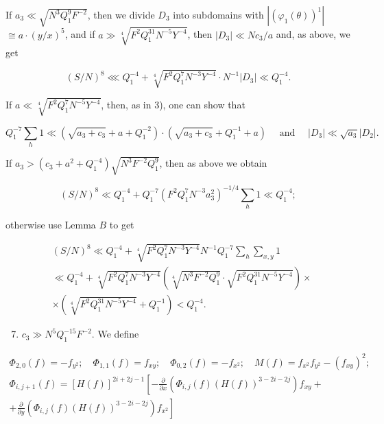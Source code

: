 \documentclass[10pt]{article}
\begin{document}
If $a_{3} \ll \sqrt{N^{3} Q_{1}^{9} F^{-2}}$, then we divide $D_{3}$ into subdomains with $\left|\left(\varphi_{1}(\theta)\right)^{1}\right|$ $\cong a \cdot(y / x)^{5}$, and if $a \gg \sqrt[4]{F^{2} Q_{1}^{31} N^{-5} Y^{-4}}$, then $\left|D_{3}\right| \ll N c_{3} / a$ and, as above, we get

$$
(S / N)^{8} \lll Q_{1}^{-4}+\sqrt[4]{F^{2} Q_{1}^{7} N^{-3} Y^{-4}} \cdot N^{-1}\left|D_{3}\right| \ll Q_{1}^{-4} .
$$

If $a \ll \sqrt[4]{F^{2} Q_{1}^{7} N^{-5} Y^{-4}}$, then, as in 3), one can show that

$$
Q_{1}^{-7} \sum_{h} 1 \ll\left(\sqrt{a_{3}+c_{3}}+a+Q_{1}^{-2}\right) \cdot\left(\sqrt{a_{3}+c_{3}}+Q_{1}^{-1}+a\right) \quad \text { and } \quad\left|D_{3}\right| \ll \sqrt{a_{3}}\left|D_{2}\right| .
$$

If $a_{3}>\left(c_{3}+a^{2}+Q_{1}^{-4}\right) \sqrt{N^{3} F^{-2} Q_{1}^{9}}$, then as above we obtain

$$
(S / N)^{8} \ll Q_{1}^{-4}+Q_{1}^{-7}\left(F^{2} Q_{1}^{7} N^{-3} a_{3}^{2}\right)^{-1 / 4} \sum_{h} 1 \ll Q_{1}^{-4} ;
$$

otherwise use Lemma $B$ to get

$$
\begin{aligned}
& (S / N)^{8} \ll Q_{1}^{-4}+\sqrt[4]{F^{2} Q_{1}^{7} N^{-3} Y^{-4}} N^{-1} Q_{1}^{-7} \sum_{h} \sum_{x, y} 1 \\
& \ll Q_{1}^{-4}+\sqrt[4]{F^{2} Q_{1}^{7} N^{-3} Y^{-4}}\left(\sqrt[4]{N^{3} F^{-2} Q_{1}^{9}} \cdot \sqrt{F^{2} Q_{1}^{31} N^{-5} Y^{-4}}\right) \times \\
& \times\left(\sqrt[4]{F^{2} Q_{1}^{31} N^{-5} Y^{-4}}+Q_{1}^{-1}\right)<Q_{1}^{-4} .
\end{aligned}
$$

\begin{enumerate}
  \setcounter{enumi}{6}
  \item $c_{3} \gg N^{5} Q_{1}^{-15} F^{-2}$. We define
\end{enumerate}

$$
\begin{array}{r}
\Phi_{2,0}(f)=-f_{y^{2}} ; \quad \Phi_{1,1}(f)=f_{x y} ; \quad \Phi_{0,2}(f)=-f_{x^{2}} ; \quad M(f)=f_{x^{2}} f_{y^{2}}-\left(f_{x y}\right)^{2} ; \\
\Phi_{i, j+1}(f)=[H(f)]^{2 i+2 j-1}\left[-\frac{\partial}{\partial x}\left(\Phi_{i, j}(f)(H(f))^{3-2 i-2 j}\right) f_{x y}+\right. \\
\left.+\frac{\partial}{\partial y}\left(\Phi_{i, j}(f)(H(f))^{3-2 i-2 j}\right) f_{x^{2}}\right]
\end{array}
$$
\end{document}
